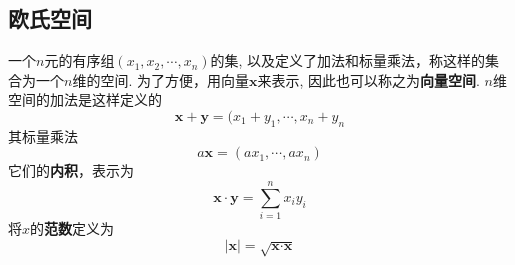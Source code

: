 \subsection{欧氏空间}

一个$n$元的有序组$(x_1, x_2, \cdots, x_n)$的集, 以及定义了加法和标量乘法，称这样的集合为一个$n$维的空间. 为了方便，用向量$\textbf{x}$来表示, 因此也可以称之为\textbf{向量空间}. $n$维空间的加法是这样定义的
$$
\textbf{x} + \textbf{y} = (x_1 + y_1, \cdots, x_n + y_n
$$
其标量乘法
$$
a\textbf{x} = (ax_1, \cdots, ax_n)
$$
它们的\textbf{内积}，表示为
$$
\textbf{x} \cdot \textbf{y} = \sum_{i = 1}^n x_i y_i
$$
将$x$的\textbf{范数}定义为
$$
|\textbf{x}| = \sqrt{\textbf{x} \cdot \textbf{x}}
$$


